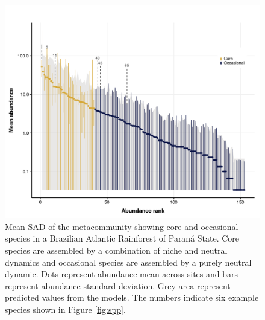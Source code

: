 \documentclass[12pt]{article}
\begin{document}
\begin{figure}[!h]
 \begin{center}
\includegraphics[scale=.75]{./fig/rad_metacommunity.pdf}
\end{center}
\caption{Mean SAD of the metacommunity showing core and occasional species in a Brazilian Atlantic Rainforest of Paran\'a State. Core species are assembled by a combination of niche and neutral dynamics and occasional species are assembled by a purely neutral dynamic. Dots represent abundance mean across sites and bars represent abundance standard deviation. Grey area represent predicted values from the models. The numbers indicate six example species shown in Figure \ref{fig:spp}.}\label{fig:rad} %
\end{figure}
\end{document}
